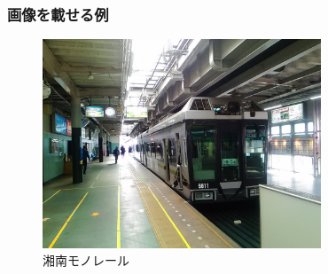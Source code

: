 \begin{frame}
    \frametitle{画像を載せる例}
    \begin{figure}[htbp]
        \centering
        \includegraphics[width=8.31cm]{shonan_monorail.jpg}
        \caption{湘南モノレール}
    \end{figure}
\end{frame}
